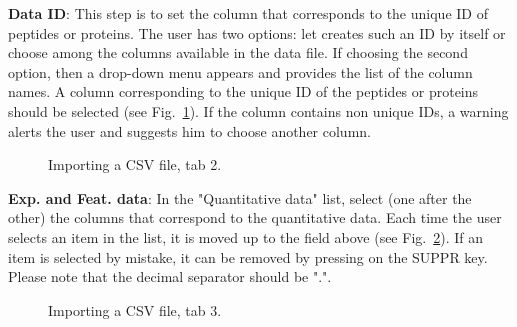 \documentclass[12pt]{article}
\begin{document}
{{\textbf {Data ID}: This step is to set the column that corresponds to the 
unique ID of peptides or proteins. The user has two options: let 
 creates such an ID by itself or choose among the columns 
available in the data file. If choosing the second option, then a drop-down 
menu appears and provides the list of the column names. A column corresponding 
to the unique ID of the peptides or proteins should be selected 
(see Fig.~\ref{fig:imp2}). If the column contains non unique IDs, a warning 
alerts the user and suggests him to choose another column.}
\begin {figure}
\centering
{}
\caption{Importing a CSV file, tab 2.}\label{fig:imp2}
\end {figure}

\textbf {Exp. and Feat. data}: In the "Quantitative data" list, select (one 
after the other) the columns that correspond to the quantitative data. 
Each time the user selects an item in the list, it is moved up to the field 
above (see Fig.~\ref{fig:imp3}). If an item is selected by mistake, it can be 
removed by pressing on the SUPPR key.
\newline Please note that the decimal separator should be ".". 
\begin {figure}
\centering
{}
\caption{Importing a CSV file, tab 3.}\label{fig:imp3}
\end {figure}

}
\end{document}
